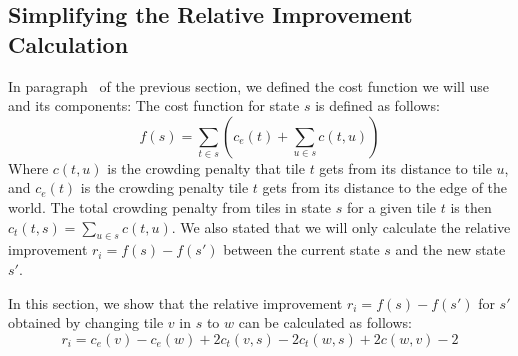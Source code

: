 \subsection{Simplifying the Relative Improvement Calculation}\label{sec:analysis-proof-improvement}

In paragraph~ of the previous section, we defined the cost function we will use and its components:
The cost function for state $s$ is defined as follows:
\begin{equation*}
    f(s) = \sum_{t \in s} \left(c_e(t) + \sum_{u \in s} c(t,u) \right)
\end{equation*}
Where $c(t,u)$ is the crowding penalty that tile $t$ gets from its distance to tile $u$, and $c_e(t)$ is the crowding penalty tile $t$ gets from its distance to the edge of the world.
The total crowding penalty from tiles in state $s$ for a given tile $t$ is then $c_t(t,s) = \sum_{u \in s} c(t,u)$.
We also stated that we will only calculate the relative improvement $r_i = f(s) - f(s')$ between the current state $s$ and the new state $s'$.

In this section, we show that the relative improvement $r_i = f(s) - f(s')$ for $s'$ obtained by changing tile $v$ in $s$ to $w$ can be calculated as follows:
\begin{equation*}
    r_i = c_e(v) - c_e(w)  + 2 c_t(v,s) - 2 c_t(w,s) + 2c(w,v) - 2
\end{equation*}

